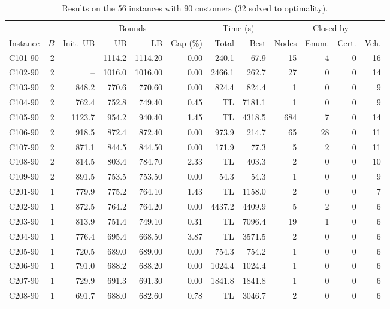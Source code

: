 \documentclass[10pt]{article}
\begin{document}
\begin{table}[p]
\centering
\caption{Results on the 56 instances with 90 customers (32 solved to optimality).}
\label{tab:n90}
\footnotesize
\setlength{\tabcolsep}{5pt}
\begin{tabular}{lrrrrrrrrrrr}
\toprule
 & & \multicolumn{4}{c}{Bounds} & \multicolumn{2}{c}{Time (s)} & & \multicolumn{2}{c}{Closed by} & \\
\cmidrule(lr){3-6}\cmidrule(lr){7-8}\cmidrule(lr){10-11}
Instance & $B$ & Init.\ UB & UB & LB & Gap (\%) & Total & Best & Nodes & Enum. & Cert. & Veh. \\
\midrule
C101-90 & 2 & -- & 1114.2 & 1114.20 & 0.00 & 240.1 & 67.9 & 15 & 4 & 0 & 16 \\
C102-90 & 2 & -- & 1016.0 & 1016.00 & 0.00 & 2466.1 & 262.7 & 27 & 0 & 0 & 14 \\
C103-90 & 2 & 848.2 & 770.6 & 770.60 & 0.00 & 824.4 & 824.4 & 1 & 0 & 0 & 9 \\
C104-90 & 2 & 762.4 & 752.8 & 749.40 & 0.45 & TL & 7181.1 & 1 & 0 & 0 & 9 \\
C105-90 & 2 & 1123.7 & 954.2 & 940.40 & 1.45 & TL & 4318.5 & 684 & 7 & 0 & 14 \\
C106-90 & 2 & 918.5 & 872.4 & 872.40 & 0.00 & 973.9 & 214.7 & 65 & 28 & 0 & 11 \\
C107-90 & 2 & 871.1 & 844.5 & 844.50 & 0.00 & 171.9 & 77.3 & 5 & 2 & 0 & 11 \\
C108-90 & 2 & 814.5 & 803.4 & 784.70 & 2.33 & TL & 403.3 & 2 & 0 & 0 & 10 \\
C109-90 & 2 & 891.5 & 753.5 & 753.50 & 0.00 & 54.3 & 54.3 & 1 & 0 & 0 & 9 \\
\midrule
C201-90 & 1 & 779.9 & 775.2 & 764.10 & 1.43 & TL & 1158.0 & 2 & 0 & 0 & 7 \\
C202-90 & 1 & 872.5 & 764.2 & 764.20 & 0.00 & 4437.2 & 4409.9 & 5 & 2 & 0 & 6 \\
C203-90 & 1 & 813.9 & 751.4 & 749.10 & 0.31 & TL & 7096.4 & 19 & 1 & 0 & 6 \\
C204-90 & 1 & 776.4 & 695.4 & 668.50 & 3.87 & TL & 3571.5 & 2 & 0 & 0 & 6 \\
C205-90 & 1 & 720.5 & 689.0 & 689.00 & 0.00 & 754.3 & 754.2 & 1 & 0 & 0 & 6 \\
C206-90 & 1 & 791.0 & 688.2 & 688.20 & 0.00 & 1024.4 & 1024.4 & 1 & 0 & 0 & 6 \\
C207-90 & 1 & 729.9 & 691.3 & 691.30 & 0.00 & 1841.8 & 1841.8 & 1 & 0 & 0 & 6 \\
C208-90 & 1 & 691.7 & 688.0 & 682.60 & 0.78 & TL & 3046.7 & 2 & 0 & 0 & 6 \\

\end{tabular}
\end{table}
\end{document}
